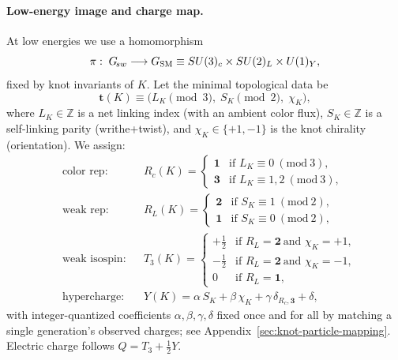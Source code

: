 \documentclass[11pt, preprint,titlepage]{revtex4-2}
\begin{document}
	\paragraph{Low-energy image and charge map.}
	At low energies we use a homomorphism
	\[
		\pi:\; G_{\!sw}\longrightarrow G_{\rm SM}\equiv SU(3)_c\times SU(2)_L\times U(1)_Y,
	\]
	fixed by knot invariants of \(K\).
	Let the minimal topological data be
	\[
		\mathbf{t}(K)\equiv\big(L_K\!\!\!\!\pmod{3},\; S_K\!\!\!\!\pmod{2},\; \chi_K\big),
	\]
	where \(L_K\in\mathbb{Z}\) is a net linking index (with an ambient color flux), \(S_K\in\mathbb{Z}\) is a self-linking parity (writhe+twist), and \(\chi_K\in\{+1,-1\}\) is the knot chirality (orientation).
	We assign:
	\begin{align}
		&\text{color rep:} &&
		R_c(K)=
		\begin{cases}
			\mathbf{1} & \text{if } L_K\equiv 0\ (\mathrm{mod}\ 3),\\
			\mathbf{3} & \text{if } L_K\equiv 1,2\ (\mathrm{mod}\ 3),
		\end{cases}
		\\[2pt]
		&\text{weak rep:} &&
		R_L(K)=
		\begin{cases}
			\mathbf{2} & \text{if } S_K\equiv 1\ (\mathrm{mod}\ 2),\\
			\mathbf{1} & \text{if } S_K\equiv 0\ (\mathrm{mod}\ 2),
		\end{cases}
		\\[2pt]
		&\text{weak isospin:} &&
		T_3(K)=
		\begin{cases}
			+\tfrac{1}{2} & \text{if } R_L=\mathbf{2}\ \text{and }\chi_K=+1,\\
			-\tfrac{1}{2} & \text{if } R_L=\mathbf{2}\ \text{and }\chi_K=-1,\\
			0 & \text{if } R_L=\mathbf{1},
		\end{cases}
		\\[2pt]
		&\text{hypercharge:} &&
		Y(K)=\alpha\,S_K+\beta\,\chi_K+\gamma\,\delta_{R_c,\mathbf{3}}+\delta,
		\label{eq:Y-map}
	\end{align}
	with integer-quantized coefficients \(\alpha,\beta,\gamma, \delta\) fixed once and for all by matching a single generation’s observed charges; see Appendix~\ref{sec:knot-particle-mapping}.
	Electric charge follows \(Q=T_3+\tfrac12 Y\).
\end{document}
